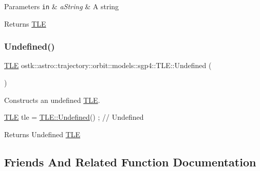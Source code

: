 \begin{DoxyParams}[1]{Parameters}
\mbox{\tt in}  & {\em a\+String} & A string \\
\hline
\end{DoxyParams}
\begin{DoxyReturn}{Returns}
\hyperlink{classostk_1_1astro_1_1trajectory_1_1orbit_1_1models_1_1sgp4_1_1_t_l_e}{T\+LE} 
\end{DoxyReturn}
\mbox{\label{classostk_1_1astro_1_1trajectory_1_1orbit_1_1models_1_1sgp4_1_1_t_l_e_a871cdedd5bc51c9f3afa976e0597ea51}} 
\subsubsection{\texorpdfstring{Undefined()}{Undefined()}}
{\footnotesize\ttfamily \hyperlink{classostk_1_1astro_1_1trajectory_1_1orbit_1_1models_1_1sgp4_1_1_t_l_e}{T\+LE} ostk\+::astro\+::trajectory\+::orbit\+::models\+::sgp4\+::\+T\+L\+E\+::\+Undefined (\begin{DoxyParamCaption}{ }\end{DoxyParamCaption})\hspace{0.3cm}{\ttfamily [static]}}



Constructs an undefined \hyperlink{classostk_1_1astro_1_1trajectory_1_1orbit_1_1models_1_1sgp4_1_1_t_l_e}{T\+LE}. 


\begin{DoxyCode}
\hyperlink{classostk_1_1astro_1_1trajectory_1_1orbit_1_1models_1_1sgp4_1_1_t_l_e_a57323db2c24577c2e8ddce79fa776d1e}{TLE} tle = \hyperlink{classostk_1_1astro_1_1trajectory_1_1orbit_1_1models_1_1sgp4_1_1_t_l_e_a871cdedd5bc51c9f3afa976e0597ea51}{TLE::Undefined}() ; \textcolor{comment}{// Undefined}
\end{DoxyCode}


\begin{DoxyReturn}{Returns}
Undefined \hyperlink{classostk_1_1astro_1_1trajectory_1_1orbit_1_1models_1_1sgp4_1_1_t_l_e}{T\+LE} 
\end{DoxyReturn}


\subsection{Friends And Related Function Documentation}
\mbox{\label{classostk_1_1astro_1_1trajectory_1_1orbit_1_1models_1_1sgp4_1_1_t_l_e_a54a7a3bca65674d5052031634f900984}} 
